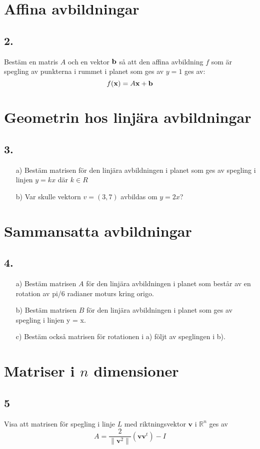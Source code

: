 \documentclass{article}
\begin{document}
\section*{Affina avbildningar}
\subsection*{2.}
Bestäm en matris $A$ och en vektor ${\bf b}$ så att den affina avbildning $f$ 
som är spegling av punkterna i rummet i planet som ges av $y=1$ ges av: 
$$f({\bf x})=A{\bf x}+{\bf b}$$

\section*{Geometrin hos linjära avbildningar}
\subsection*{3.}
\begin{itemize}
\item[a) ] Bestäm matrisen för den linjära avbildningen i planet som ges av spegling i linjen $y = kx$ där 
$k \in R$
\item[b) ] Var skulle vektorn $v = (3, 7)$ avbildas om $y = 2x$? 
\end{itemize}

\section*{Sammansatta avbildningar}
\subsection*{4.}
\begin{itemize}
\item[a) ] Bestäm matrisen $A$ för den linjära avbildningen i planet som består av en rotation av pi/6 radianer moturs kring origo.
\item[b) ] Bestäm matrisen $B$ för den linjära avbildningen i planet som ges av spegling i linjen y = x.
\item[c) ] Bestäm också matrisen för rotationen i a) följt av speglingen i b).
\end{itemize}


\section*{Matriser i $n$ dimensioner}
\subsection*{5}
Visa att matrisen för spegling i linje $L$ med riktningsvektor $\mathbf{v}$ i 
$\mathbb{R}^n$ ges av $$A = \frac{2}{\parallel \mathbf{v}^2 \parallel}
(\mathbf{v} \mathbf{v}^t)-I$$
\end{document}
